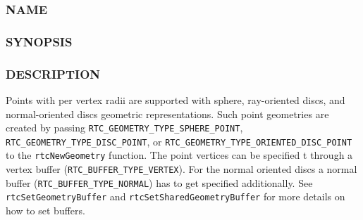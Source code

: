 \subsubsection{NAME}\label{name}

\begin{Shaded}
\begin{Highlighting}[]
\OperatorTok{{-}}

\OperatorTok{{-}}
\OperatorTok{{-}}

\OperatorTok{{-}}
\OperatorTok{{-}}
\end{Highlighting}
\end{Shaded}

\subsubsection{SYNOPSIS}\label{synopsis}

\begin{Shaded}
\begin{Highlighting}[]

\OperatorTok{(}\OperatorTok{,}\OperatorTok{);}
\OperatorTok{(}\OperatorTok{,}\OperatorTok{);}
\OperatorTok{(}\OperatorTok{,}\OperatorTok{);}
\end{Highlighting}
\end{Shaded}

\subsubsection{DESCRIPTION}\label{description}

Points with per vertex radii are supported with sphere, ray-oriented
discs, and normal-oriented discs geometric representations. Such point
geometries are created by passing
\texttt{RTC\_GEOMETRY\_TYPE\_SPHERE\_POINT},
\texttt{RTC\_GEOMETRY\_TYPE\_DISC\_POINT}, or
\texttt{RTC\_GEOMETRY\_TYPE\_ORIENTED\_DISC\_POINT} to the
\texttt{rtcNewGeometry} function. The point vertices can be specified t
through a vertex buffer (\texttt{RTC\_BUFFER\_TYPE\_VERTEX}). For the
normal oriented discs a normal buffer
(\texttt{RTC\_BUFFER\_TYPE\_NORMAL}) has to get specified additionally.
See \texttt{rtcSetGeometryBuffer} and
\texttt{rtcSetSharedGeometryBuffer} for more details on how to set
buffers.

